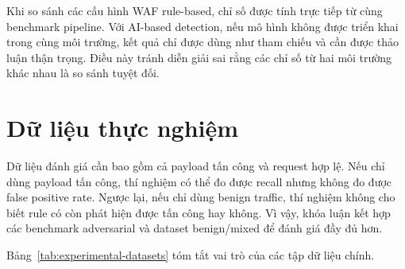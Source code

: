 Khi so sánh các cấu hình WAF rule-based, chỉ số được tính trực tiếp từ cùng benchmark pipeline. Với AI-based detection, nếu mô hình không được triển khai trong cùng môi trường, kết quả chỉ được dùng như tham chiếu và cần được thảo luận thận trọng. Điều này tránh diễn giải sai rằng các chỉ số từ hai môi trường khác nhau là so sánh tuyệt đối.

\section{Dữ liệu thực nghiệm}
\label{sec:experimental-datasets}

Dữ liệu đánh giá cần bao gồm cả payload tấn công và request hợp lệ. Nếu chỉ dùng payload tấn công, thí nghiệm có thể đo được recall nhưng không đo được false positive rate. Ngược lại, nếu chỉ dùng benign traffic, thí nghiệm không cho biết rule có còn phát hiện được tấn công hay không. Vì vậy, khóa luận kết hợp các benchmark adversarial và dataset benign/mixed để đánh giá đầy đủ hơn.

Bảng~\ref{tab:experimental-datasets} tóm tắt vai trò của các tập dữ liệu chính.

